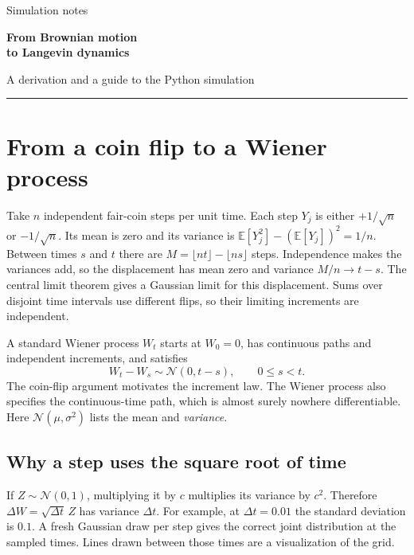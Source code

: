 \documentclass[11pt,a4paper]{article}
\newcommand{\E}{\mathbb E}
\newcommand{\N}{\mathcal N}
\begin{document}
{\color{teal}\large Simulation notes}\par
{\color{ink}\Huge\bfseries From Brownian motion\\[3pt] to Langevin dynamics}\par
\vspace{4pt}
{\large A derivation and a guide to the Python simulation}\par
\vspace{8pt}
\noindent\textcolor{teal}{\rule{\linewidth}{1pt}}
\tableofcontents

\section{From a coin flip to a Wiener process}
Take \(n\) independent fair-coin steps per unit time. Each step \(Y_j\) is either
\(+1/\sqrt n\) or \(-1/\sqrt n\). Its mean is zero and its variance is
\(\E[Y_j^2]-(\E[Y_j])^2=1/n\).
Between times \(s\) and \(t\) there are
\(M=\lfloor nt\rfloor-\lfloor ns\rfloor\) steps. Independence makes the
variances add, so the displacement has mean zero and variance \(M/n\to t-s\).
The central limit theorem gives a Gaussian limit for this displacement.
Sums over disjoint time intervals use different flips, so their limiting
increments are independent.

A standard Wiener process \(W_t\) starts at \(W_0=0\), has continuous paths
and independent increments, and satisfies
\[
 W_t-W_s\sim\N(0,t-s),\qquad 0\le s<t.
\]
The coin-flip argument motivates the increment law. The Wiener process also
specifies the continuous-time path, which is almost surely nowhere differentiable.
Here \(\N(\mu,\sigma^2)\) lists the mean and \emph{variance}.

\subsection*{Why a step uses the square root of time}
If \(Z\sim\N(0,1)\), multiplying it by \(c\) multiplies its variance by \(c^2\).
Therefore \(\Delta W=\sqrt{\Delta t}\,Z\) has variance \(\Delta t\).
For example, at \(\Delta t=0.01\) the standard deviation is \(0.1\).
A fresh Gaussian draw per step gives the correct joint distribution at the
sampled times. Lines drawn between those times are a visualization of the grid.
\newpage
\end{document}
